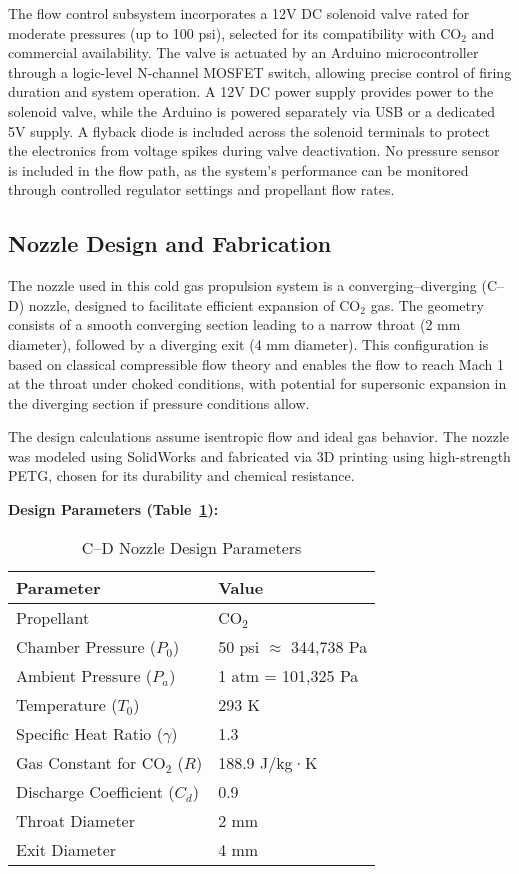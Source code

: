 \documentclass{new-aiaa}
\begin{document}
The flow control subsystem incorporates a 12V DC solenoid valve rated for moderate pressures (up to 100 psi), selected for its compatibility with CO$_2$ and commercial availability. The valve is actuated by an Arduino microcontroller through a logic-level N-channel MOSFET switch, allowing precise control of firing duration and system operation. A 12V DC power supply provides power to the solenoid valve, while the Arduino is powered separately via USB or a dedicated 5V supply. A flyback diode is included across the solenoid terminals to protect the electronics from voltage spikes during valve deactivation. No pressure sensor is included in the flow path, as the system’s performance can be monitored through controlled regulator settings and propellant flow rates.


\subsection{Nozzle Design and Fabrication}

The nozzle used in this cold gas propulsion system is a converging–diverging (C–D) nozzle, designed to facilitate efficient expansion of CO$_2$ gas. The geometry consists of a smooth converging section leading to a narrow throat (2 mm diameter), followed by a diverging exit (4 mm diameter). This configuration is based on classical compressible flow theory and enables the flow to reach Mach 1 at the throat under choked conditions, with potential for supersonic expansion in the diverging section if pressure conditions allow.

The design calculations assume isentropic flow and ideal gas behavior. The nozzle was modeled using SolidWorks and fabricated via 3D printing using high-strength PETG, chosen for its durability and chemical resistance.

\vspace{0.5em}
\noindent
\textbf{Design Parameters (Table~\ref{tab:nozzleparams}):}

\begin{table}[h]
\centering
\caption{C–D Nozzle Design Parameters}
\label{tab:nozzleparams}
\begin{tabular}{ll}
\toprule
\textbf{Parameter} & \textbf{Value} \\
\midrule
Propellant & CO$_2$ \\
Chamber Pressure ($P_0$) & 50 psi $\approx$ 344,738 Pa \\
Ambient Pressure ($P_a$) & 1 atm = 101,325 Pa \\
Temperature ($T_0$) & 293 K \\
Specific Heat Ratio ($\gamma$) & 1.3 \\
Gas Constant for CO$_2$ ($R$) & 188.9 J/kg·K \\
Discharge Coefficient ($C_d$) & 0.9 \\
Throat Diameter & 2 mm \\
Exit Diameter & 4 mm \\
\bottomrule
\end{tabular}
\end{table}
\end{document}

